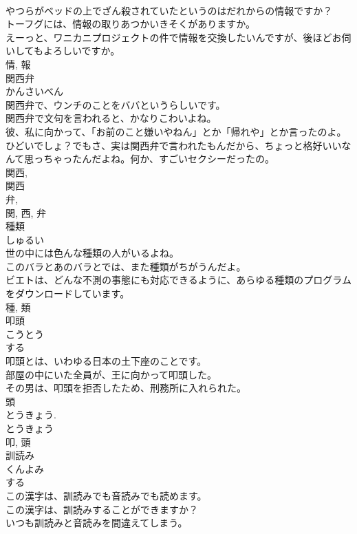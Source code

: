 \documentclass[8pt]{extreport}
\begin{document}
\begin{CJK}{UTF8}{min}
\\	やつらがベッドの上でざん殺されていたというのはだれからの情報ですか？	
\\	トーフグには、情報の取りあつかいきそくがありますか。	
\\	えーっと、ワニカニプロジェクトの件で情報を交換したいんですが、後ほどお伺いしてもよろしいですか。	
\\	情, 報	
\\	関西弁	
\\	かんさいべん	
\\	関西弁で、ウンチのことをババというらしいです。	
\\	関西弁で文句を言われると、かなりこわいよね。	
\\	彼、私に向かって、「お前のこと嫌いやねん」とか「帰れや」とか言ったのよ。ひどいでしょ？でもさ、実は関西弁で言われたもんだから、ちょっと格好いいなんて思っちゃったんだよね。何か、すごいセクシーだったの。	
\\	関西, 
\\	関西
\\	弁, 
\\	関, 西, 弁	
\\	種類	
\\	しゅるい	
\\	世の中には色んな種類の人がいるよね。	
\\	このバラとあのバラとでは、また種類がちがうんだよ。	
\\	ビエトは、どんな不測の事態にも対応できるように、あらゆる種類のプログラムをダウンロードしています。	
\\	種, 類	
\\	叩頭	
\\	こうとう	
\\	する 
\\	叩頭とは、いわゆる日本の土下座のことです。	
\\	部屋の中にいた全員が、王に向かって叩頭した。	
\\	その男は、叩頭を拒否したため、刑務所に入れられた。	
\\	頭 
\\	とうきょう. 
\\	とうきょう 
\\	叩, 頭	
\\	訓読み	
\\	くんよみ	
\\	する 
\\	この漢字は、訓読みでも音読みでも読めます。	
\\	この漢字は、訓読みすることができますか？	
\\	いつも訓読みと音読みを間違えてしまう。	

\end{CJK}
\end{document}
